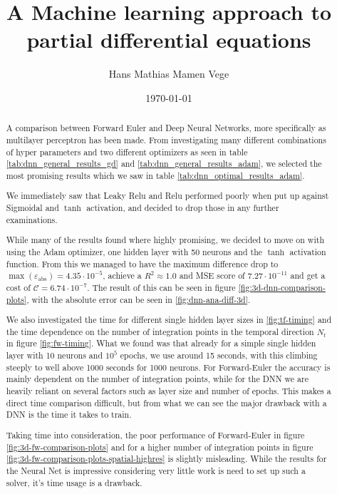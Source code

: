 \documentclass[11pt]{article}
\title{A Machine learning approach to partial differential equations}
\author{Hans Mathias Mamen Vege}
\date{\today}
\begin{document}
\maketitle

\begin{abstract}
A comparison between Forward Euler and Deep Neural Networks, more specifically as multilayer perceptron has been made. From investigating many different combinations of hyper parameters and two different optimizers as seen in table \ref{tab:dnn_general_results_gd} and \ref{tab:dnn_general_results_adam}, we selected the most promising results which we saw in table \ref{tab:dnn_optimal_results_adam}. 

We immediately saw that Leaky Relu and Relu performed poorly when put up against Sigmoidal and $\tanh$ activation, and decided to drop those in any further examinations.

While many of the results found where highly promising, we decided to move on with using the Adam optimizer, one hidden layer with 50 neurons and the $\tanh$ activation function. From this we managed to have the maximum difference drop to $\max(\varepsilon_\mathrm{abs})=4.35\cdot 10^{-5}$, achieve a $R^2 \approx 1.0$ and MSE score of $7.27\cdot 10^{-11}$ and get a cost of $\mathcal{C} = 6.74 \cdot 10^{-7}$. The result of this can be seen in figure \ref{fig:3d-dnn-comparison-plots}, with the absolute error can be seen in \ref{fig:dnn-ana-diff-3d}.

We also investigated the time for different single hidden layer sizes in \ref{fig:tf-timing} and the time dependence on the number of integration points in the temporal direction $N_t$ in figure \ref{fig:fw-timing}. What we found was that already for a simple single hidden layer with 10 neurons and $10^5$ epochs, we use around 15 seconds, with this climbing steeply to well above 1000 seconds for 1000 neurons. For Forward-Euler the accuracy is mainly dependent on the number of integration points, while for the DNN we are heavily reliant on several factors such as layer size and number of epochs. This makes a direct time comparison difficult, but from what we can see the major drawback with a DNN is the time it takes to train.

Taking time into consideration, the poor performance of Forward-Euler in figure \ref{fig:3d-fw-comparison-plots} and for a higher number of integration points in figure \ref{fig:3d-fw-comparison-plots-spatial-highres} is slightly misleading. While the results for the Neural Net is impressive considering very little work is need to set up such a solver, it's time usage is a drawback.

\end{abstract}
\end{document}
